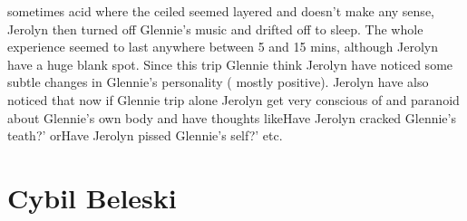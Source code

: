 \documentclass[12pt]{book}
\begin{document}
sometimes acid where the ceiled seemed layered and doesn't make any sense, Jerolyn then turned off Glennie's music and drifted off to sleep. The whole experience seemed to last anywhere between 5 and 15 mins, although Jerolyn have a huge blank spot. Since this trip Glennie think Jerolyn have noticed some subtle changes in Glennie's personality ( mostly positive). Jerolyn have also noticed that now if Glennie trip alone Jerolyn get very conscious of and paranoid about Glennie's own body and have thoughts likeHave Jerolyn cracked Glennie's teath?' orHave Jerolyn pissed Glennie's self?' etc.



\chapter{Cybil Beleski}
\end{document}
